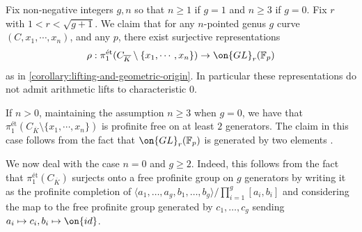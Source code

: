 \begin{example}
\notready
	\label{example:non-liftable-representations}
	Fix non-negative integers $g,n$ so that $n \geq 1$ if $g =1$ and $n\geq
	3$ if $g = 0$.
	Fix $r$ with $1<r<\sqrt{g+1}$. We claim
	that for any $n$-pointed genus $g$ curve $(C, x_1, \cdots, x_n)$, and any $p$,
	there exist surjective representations $$\rho:
	\pi_1^{\text{\'et}}(C_{\overline{K}}\setminus\{x_1, \cdots, x_n\})\to
	\on{GL}_r(\mathbb{F}_p)$$ as in \autoref{corollary:lifting-and-geometric-origin}.
	In particular these representations do not admit arithmetic lifts to
	characteristic $0$.

	If $n > 0$, maintaining the assumption $n \geq 3$ when $g = 0$, we have
	that
$\pi_1^{\text{\'et}}(C_{\overline{K}}\setminus\{x_1, \cdots, x_n\})$ is
profinite free on at least $2$ generators.
The claim in this case follows from the fact that $\on{GL}_r(\mathbb{F}_p)$ is generated by two elements
\cite{waterhouse:two-generators}.

We now deal with the case $n =0$ and $g \geq 2$.
Indeed, this follows from the fact that
$\pi_1^{\text{\'et}}(C_{\overline{K}})$ surjects onto a free profinite group on
$g$ generators by writing it as the profinite completion of $\langle a_1, \ldots,
a_g, b_1, \ldots, b_g \rangle/ \prod_{i=1}^g [a_i, b_i]$ and considering the map
to the free profinite group generated by $c_1, \ldots, c_g$ sending $a_i \mapsto
c_i, b_i \mapsto \on{id}$.
\end{example}

